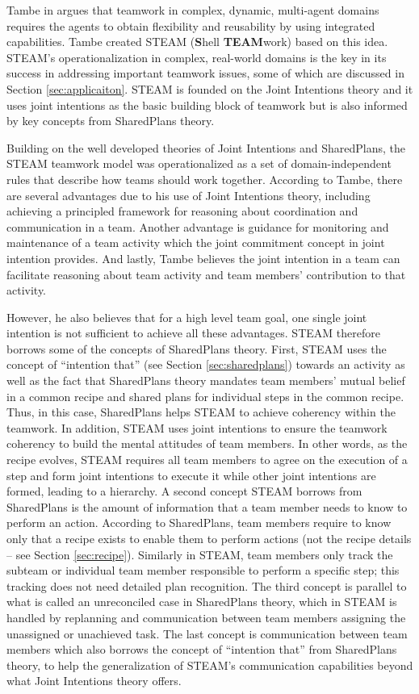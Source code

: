 \documentclass[12pt]{report}
\begin{document}
Tambe in \cite{tambe:flexible-teamwork} argues that teamwork in complex,
dynamic, multi-agent domains requires the agents to obtain flexibility and
reusability by using integrated capabilities. Tambe created STEAM
(\textbf{S}hell \textbf{TEAM}work) based on this idea. STEAM's
operationalization in complex, real-world domains is the key in its success in
addressing important teamwork issues, some of which are discussed in Section
\ref{sec:applicaiton}. STEAM is founded on the Joint Intentions theory and it
uses joint intentions as the basic building block of teamwork but is also
informed by key concepts from SharedPlans theory.

Building on the well developed theories of Joint Intentions and SharedPlans, the
STEAM teamwork model was operationalized as a set of domain-independent rules
that describe how teams should work together. According to Tambe, there are
several advantages due to his use of Joint Intentions theory, including
achieving a principled framework for reasoning about coordination and
communication in a team. Another advantage is guidance for monitoring and
maintenance of a team activity which the joint commitment concept in joint
intention provides. And lastly, Tambe believes the joint intention in a team can
facilitate reasoning about team activity and team members' contribution to that
activity.

However, he also believes that for a high level team goal, one single joint
intention is not sufficient to achieve all these advantages. STEAM therefore
borrows some of the concepts of SharedPlans theory. First, STEAM uses the
concept of ``intention that'' (see Section \ref{sec:sharedplans}) towards an
activity as well as the fact that SharedPlans theory mandates team members'
mutual belief in a common recipe and shared plans for individual steps in the
common recipe. Thus, in this case, SharedPlans helps STEAM to achieve coherency
within the teamwork. In addition, STEAM uses joint intentions to ensure the
teamwork coherency to build the mental attitudes of team members. In other
words, as the recipe evolves, STEAM requires all team members to agree on the
execution of a step and form joint intentions to execute it while other joint
intentions are formed, leading to a hierarchy. A second concept STEAM borrows
from SharedPlans is the amount of information that a team member needs to know
to perform an action. According to SharedPlans, team members require to know
only that a recipe exists to enable them to perform actions (not the recipe
details -- see Section \ref{sec:recipe}). Similarly in STEAM, team members only
track the subteam or individual team member responsible to perform a specific
step; this tracking does not need detailed plan recognition. The third concept
is parallel to what is called an unreconciled case in SharedPlans theory, which
in STEAM is handled by replanning and communication between team members
assigning the unassigned or unachieved task. The last concept is communication
between team members which also borrows the concept of ``intention that'' from
SharedPlans theory, to help the generalization of STEAM's communication
capabilities beyond what Joint Intentions theory offers.
\end{document}
